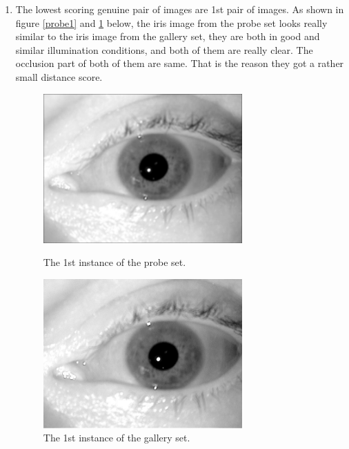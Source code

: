 \documentclass[a4paper]{article}
\begin{document}
\begin{spacing}{2.0}
\begin{enumerate}
	\item The lowest scoring genuine pair of images are 1st pair of images. As shown in figure \ref{probe1} and \ref{gallery1} below, the iris image from the probe set looks really similar to the iris image from the gallery set, they are both in good and similar illumination conditions, and both of them are really clear. The occlusion part of both of them are same. That is the reason they got a rather small distance score.
	\begin{figure}[H]
	\begin{minipage}[t]{0.5\linewidth}
	\centering
	\includegraphics[width = 3in]{probe1.jpg}
	\caption{The 1st instance of the probe set.}
	\label{probe1}
	\end{minipage}
	\begin{minipage}[t]{0.5\linewidth}
	\centering
	\includegraphics[width = 3in]{gallery1.jpg}
	\caption{The 1st instance of the gallery set.}
	\label{gallery1}
	\end{minipage}
	\end{figure}
	

\end{enumerate}
\end{spacing}
\end{document}
